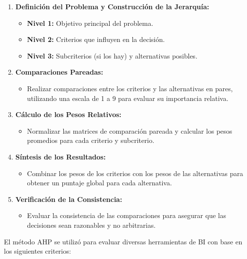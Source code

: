 \documentclass[
  11pt,
  bookmarksnumbered]{article}
\providecommand{\tightlist}{%
  \setlength{\itemsep}{0pt}\setlength{\parskip}{0pt}}
\begin{document}
\begin{enumerate}
\def\labelenumi{\arabic{enumi}.}
\item
  \textbf{Definición del Problema y Construcción de la Jerarquía:}

  \begin{itemize}
  \item
    \textbf{Nivel 1:} Objetivo principal del problema.
  \item
    \textbf{Nivel 2:} Criterios que influyen en la decisión.
  \item
    \textbf{Nivel 3:} Subcriterios (si los hay) y alternativas posibles.
  \end{itemize}
\item
  \textbf{Comparaciones Pareadas:}

  \begin{itemize}
  \tightlist
  \item
    Realizar comparaciones entre los criterios y las alternativas en pares, utilizando una escala de 1 a 9 para evaluar su importancia relativa.
  \end{itemize}
\item
  \textbf{Cálculo de los Pesos Relativos:}

  \begin{itemize}
  \tightlist
  \item
    Normalizar las matrices de comparación pareada y calcular los pesos promedios para cada criterio y subcriterio.
  \end{itemize}
\item
  \textbf{Síntesis de los Resultados:}

  \begin{itemize}
  \tightlist
  \item
    Combinar los pesos de los criterios con los pesos de las alternativas para obtener un puntaje global para cada alternativa.
  \end{itemize}
\item
  \textbf{Verificación de la Consistencia:}

  \begin{itemize}
  \tightlist
  \item
    Evaluar la consistencia de las comparaciones para asegurar que las decisiones sean razonables y no arbitrarias.
  \end{itemize}
\end{enumerate}

El método AHP se utilizó para evaluar diversas herramientas de BI con base en los siguientes criterios:
\end{document}
